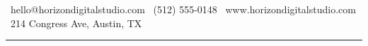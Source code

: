 \documentclass[11pt]{article}
\begin{document}
\vspace{1.2em}
\noindent
\small\color{softgray}
\faEnvelope\ hello@horizondigitalstudio.com \quad
\faPhone\ (512) 555-0148 \quad
\faGlobe\ www.horizondigitalstudio.com \quad
\faMapMarker\ 214 Congress Ave, Austin, TX

\vspace{4pt}
{\color{accent2}\rule{\linewidth}{0.6pt}}

\clearpage










\end{document}
